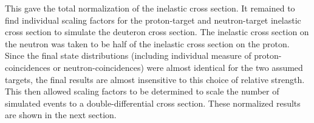 \documentclass[12pt,letterpaper,oneside]{article}
\begin{document}
This gave the total normalization of the inelastic cross section.
It remained to find individual scaling factors for the proton-target
and neutron-target inelastic cross section to simulate the deuteron
cross section.  The inelastic cross section on the neutron was taken
to be half of the inelastic cross section on the proton.  Since the
final state distributions (including individual measure of 
proton-coincidences or neutron-coincidences) were almost identical for
the two assumed targets, the final results are almost insensitive to
this choice of relative strength.  This then allowed scaling factors
to be determined to scale the number of simulated events to a
double-differential cross section.  These normalized results are shown
in the next section.




\end{document}
